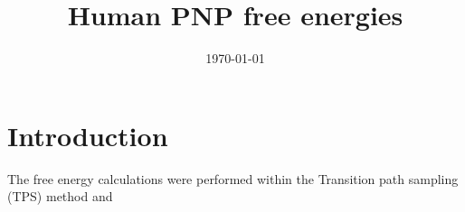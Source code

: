 \documentclass[notitlepage,preprint,%
amssymb,amsmath,
 aip,jcp%
]{revtex4-1}
\begin{document}
\title{Human PNP free energies}
\author{}
%
\date{\today}
\maketitle


\section{Introduction}
The free energy calculations were performed within the Transition path sampling (TPS) method and 



\end{document}
